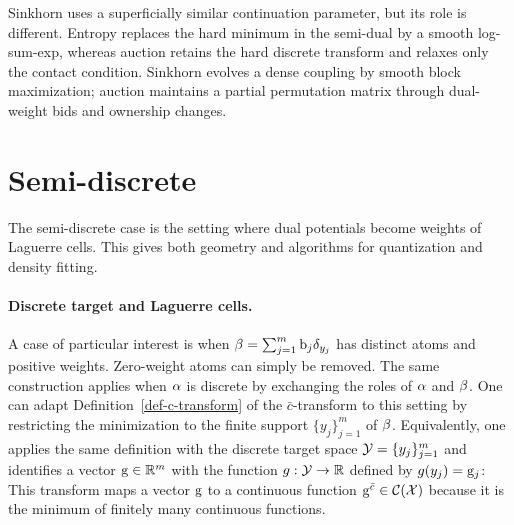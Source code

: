 \begin{rem}
	Sinkhorn uses a superficially similar continuation parameter, but its role is different. Entropy replaces the hard minimum in the semi-dual by a smooth log-sum-exp, whereas auction retains the hard discrete transform and relaxes only the contact condition. Sinkhorn evolves a dense coupling by smooth block maximization; auction maintains a partial permutation matrix through dual-weight bids and ownership changes.
\end{rem}


\section{Semi-discrete}


The semi-discrete case is the setting where dual potentials become weights of Laguerre cells. This gives both geometry and algorithms for quantization and density fitting.

\paragraph{Discrete target and Laguerre cells.}

A case of particular interest is when
\(
\beta = \sum_{j=1}^m \mathrm{b}_j \delta_{y_j}
\)
has distinct atoms and positive weights. Zero-weight atoms can simply be removed. The same construction applies when $\alpha$ is discrete by exchanging the roles of $\alpha$ and $\beta$.
%
One can adapt Definition~\ref{def-c-transform} of the $\bar c$-transform to this setting by restricting the minimization to the finite support $\{y_j\}_{j=1}^m$ of $\beta$. Equivalently, one applies the same definition with the discrete target space $\mathcal{Y}=\{y_j\}_{j=1}^m$ and identifies a vector $\mathrm{g}\in\mathbb{R}^m$ with the function $g:\mathcal{Y}\to\mathbb{R}$ defined by $g(y_j)=\mathrm{g}_j$:
This transform maps a vector $\mathrm{g}$ to a continuous function $\mathrm{g}^{\bar {c}} \in \mathcal{C}(\mathcal{X})$ because it is the minimum of finitely many continuous functions.

